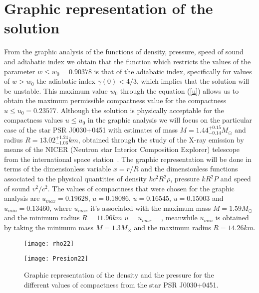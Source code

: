 \documentclass[12pt,onecolumn,a4paper]{article}
\begin{document}
\section{Graphic representation of the solution}
\label{seccion4}
From the graphic analysis of the functions of density, pressure, speed of sound and adiabatic index we obtain that the function which restricts the values of the parameter $w\leq w_0=0.90378$ is that of the adiabatic index, specifically for values of $w > w_0$ the adiabatic index $\gamma (0) <4/3$, which implies that the solution will be unstable. 
This maximum value $w_0$ through the equation (\ref{u}) allows us to obtain the maximum permissible compactness value for the compactness $u\leq u_0= 0.23577$. Although the solution is physically acceptable for the compactness values  $u\leq u_0$ in the graphic analysis we will focus on the particular case of the star PSR J0030+0451 with estimates of mass $M=1.44^{+0.15}_{-0.14}M_\odot$  and radius $R=13.02^{+1.24}_{-1.06}km$, obtained through the study of the X-ray emission by means of the NICER (Neutron star Interior Composition Explorer) telescope from the international space station\, \cite{PSRJ00300451}. The graphic representation will be done in terms of the dimensionless variable $x=r/R$ and the dimensionless functions associated to the physical quantities of density $kc^2R^2 \rho$,  pressure $kR^2 P$ and speed of sound $v^2/c^2$. The values of compactness that were chosen for the graphic analysis are $u_{max}=0.19628$,
$u=0.18086$,  $u=0.16545$,  $u=0.15003$ and   $u_{min}=0.13460$,  where  $u_{max}$ it's associated with the maximum mass  $M=1.59 M_\odot$ and the minimum radius $R=11.96km$ $u=u_{max}=$, meanwhile  $u_{min}$ is obtained by taking the minimum mass $M=1.3 M_\odot$ and the maximum radius $R=14.26km$. 
\begin{figure}[htb!]
\begin{minipage}[t]{0.43\linewidth}
\centering
\texttt{[image: rho22]}
\end{minipage}
\hspace{0.9cm} 
\begin{minipage}[t]{0.43\linewidth}
\centering
\texttt{[image: Presion22]}
\end{minipage}
\caption{Graphic representation of the density and the pressure for the different values of compactness from the star PSR J0030+0451.}
\label{dendsidadypresion}
\end{figure}
\end{document}
